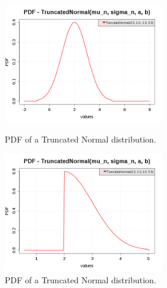 \begin{figure}[H]
  \begin{minipage}{10cm}
    \begin{center}
      \includegraphics[width=7cm]{pdf_TruncatedNormal_2.png}
      \caption{PDF of a  Truncated Normal distribution.}
      \label{PDFTruncatedNormal2}
    \end{center}
  \end{minipage}
  \hfill
  \begin{minipage}{10cm}
    \begin{center}
      \includegraphics[width=7cm]{pdf_TruncatedNormal_3.png}
      \caption{PDF of a  Truncated Normal distribution.}
      \label{PDFTruncatedNormal3}
    \end{center}
  \end{minipage}
\end{figure}


